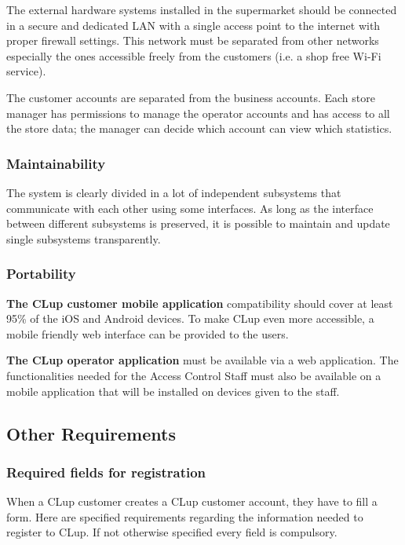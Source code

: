 \smallskip

The external hardware systems installed in the supermarket should be connected in a secure and dedicated LAN with a single access point to the internet with proper firewall settings. This network must be separated from other networks especially the ones accessible freely from the customers (i.e. a shop free Wi-Fi service).

\smallskip

The customer accounts are separated from the business accounts. Each store manager has permissions to manage the operator accounts and has access to all the store data; the manager can decide which account can view which statistics.
\subsubsection{Maintainability}
The system is clearly divided in a lot of independent subsystems that communicate with each other using some interfaces. As long as the interface between different subsystems is preserved, it is possible to maintain and update single subsystems transparently.
\subsubsection{Portability}
\textbf{The CLup customer mobile application} compatibility should cover at least 95\% of the iOS and Android devices. To make CLup even more accessible, a mobile friendly web interface can be provided to the users.

\smallskip

\textbf{The CLup operator application} must be available via a web application. The functionalities needed for the Access Control Staff must also be available on a mobile application that will be installed on devices given to the staff.
\subsection{Other Requirements}
\subsubsection{Required fields for registration}
When a CLup customer creates a CLup customer account, they have to fill a form. Here are specified requirements regarding the information needed to register to CLup. If not otherwise specified every field is compulsory.

